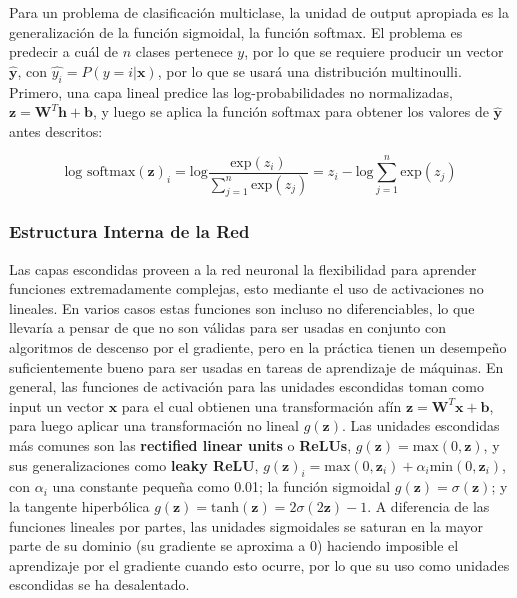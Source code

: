 Para un problema de clasificaci\'on multiclase, la unidad de output apropiada es la generalizaci\'on de la funci\'on sigmoidal, la funci\'on softmax. El problema es predecir a cu\'al de $n$ clases pertenece $y$, por lo que se requiere producir un vector $\hat{\bm{y}}$, con $\hat{y_{i}} = P(y=i|\bm{x})$, por lo que se usar\'a una distribuci\'on multinoulli. Primero, una capa lineal predice las log-probabilidades no normalizadas, $\bm{z} = \bm{W}^{T}\bm{h} + \bm{b}$, y luego se aplica la funci\'on softmax para obtener los valores de $\hat{\bm{y}}$ antes descritos:

\begin{equation}
\textrm{log softmax}(\bm{z})_{i} = \textrm{log}\frac{\textrm{exp}(z_{i})}{\sum_{j=1}^{n}\textrm{exp}({z_{j}})} = z_{i} - \textrm{log}\sum_{j=1}^{n}\textrm{exp}({z_{j}})
\end{equation}

\subsubsection{Estructura Interna de la Red}

Las capas escondidas proveen a la red neuronal la flexibilidad para aprender funciones extremadamente complejas, esto mediante el uso de activaciones no lineales. En varios casos estas funciones son incluso no diferenciables, lo que llevar\'ia a pensar de que no son v\'alidas para ser usadas en conjunto con algoritmos de descenso por el gradiente, pero en la pr\'actica tienen un desempe\~{n}o suficientemente bueno para ser usadas en tareas de aprendizaje de m\'aquinas. En general, las funciones de activaci\'on para las unidades escondidas toman como input un vector $\bm{x}$ para el cual obtienen una transformaci\'on af\'in $\bm{z} = \bm{W}^{T}\bm{x} + \bm{b}$, para luego aplicar una transformaci\'on no lineal $g(\bm{z})$. Las unidades escondidas m\'as comunes son las \textbf{rectified linear units} o \textbf{ReLUs}, $g(\bm{z}) = \textrm{max}(0, \bm{z})$, y sus generalizaciones como \textbf{leaky ReLU}, $g(\bm{z})_{i} = \textrm{max}(0, \bm{z}_{i}) + \alpha_{i}\textrm{min}(0, \bm{z}_{i})$, con $\alpha_{i}$ una constante peque\~{n}a como 0.01; la funci\'on sigmoidal $g(\bm{z}) = \sigma(\bm{z})$; y la tangente hiperb\'olica $g(\bm{z}) =  \textrm{tanh}(\bm{z}) = 2\sigma(2\bm{z}) - 1$. A diferencia de las funciones lineales por partes, las unidades sigmoidales se saturan en la mayor parte de su dominio (su gradiente se aproxima a 0) haciendo imposible el aprendizaje por el gradiente cuando esto ocurre, por lo que su uso como unidades escondidas se ha desalentado.

